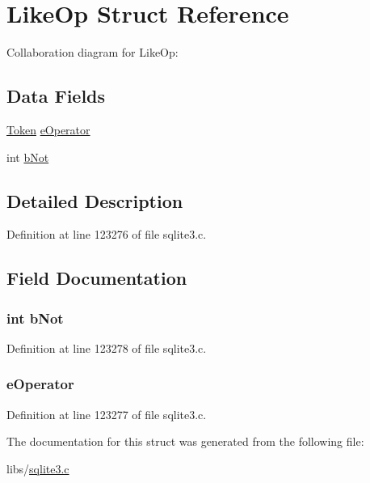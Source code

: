 \hypertarget{struct_like_op}{}\section{Like\+Op Struct Reference}
\label{struct_like_op}


Collaboration diagram for Like\+Op\+:
\subsection*{Data Fields}
\begin{DoxyCompactItemize}
\item 
\hyperlink{struct_token}{Token} \hyperlink{struct_like_op_ae6cd35e30770699b750602931353d536}{e\+Operator}
\item 
int \hyperlink{struct_like_op_a748081a91c0a5297723a32e75072d136}{b\+Not}
\end{DoxyCompactItemize}


\subsection{Detailed Description}


Definition at line 123276 of file sqlite3.\+c.



\subsection{Field Documentation}
\hypertarget{struct_like_op_a748081a91c0a5297723a32e75072d136}{}
\subsubsection[{b\+Not}]{\setlength{\rightskip}{0pt plus 5cm}int b\+Not}\label{struct_like_op_a748081a91c0a5297723a32e75072d136}


Definition at line 123278 of file sqlite3.\+c.

\hypertarget{struct_like_op_ae6cd35e30770699b750602931353d536}{}
\subsubsection[{e\+Operator}]{ e\+Operator}\label{struct_like_op_ae6cd35e30770699b750602931353d536}


Definition at line 123277 of file sqlite3.\+c.



The documentation for this struct was generated from the following file\+:\begin{DoxyCompactItemize}
\item 
libs/\hyperlink{sqlite3_8c}{sqlite3.\+c}\end{DoxyCompactItemize}
